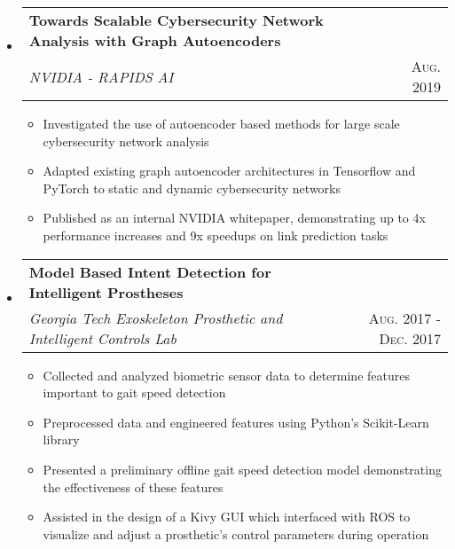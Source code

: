 \documentclass[letterpaper,11pt]{article}
\makeatletter
\newcommand{\resumePlainItem}[1]{
  \item\small{#1 \vspace{-2pt}}
}
\newcommand{\resumeSubheading}[4]{
  \vspace{-1pt}\item[]
    \begin{tabular*}{0.97\textwidth}{l@{\extracolsep{\fill}}r}
      \textbf{#1} & #2 \\
      \textit{\small#3} & \textsc{\small #4} \\ %
    \end{tabular*}\vspace{-5pt}
}
\newcommand{\resumeSubHeadingListStart}{\begin{itemize}[leftmargin=*]}
\newcommand{\resumeSubHeadingListEnd}{\end{itemize}}
\newcommand{\resumeItemListStart}{\begin{itemize}}
\newcommand{\resumeItemListEnd}{\end{itemize}\vspace{-5pt}}
\newenvironment{resumeItemList}{\resumeItemListStart}{\resumeItemListEnd}
\newenvironment{resumeSubheadingList}{\resumeSubHeadingListStart}{\resumeSubHeadingListEnd}
\makeatother
\begin{document}
\begin{resumeSubheadingList}
    \resumeSubheading
    {Towards Scalable Cybersecurity Network Analysis with Graph Autoencoders}{}
    {NVIDIA - RAPIDS AI}{Aug. 2019}
    \begin{resumeItemList}
      \resumePlainItem{Investigated the use of autoencoder based methods for large scale cybersecurity network analysis}
      \resumePlainItem{Adapted existing graph autoencoder architectures in Tensorflow and PyTorch to static and dynamic
      cybersecurity networks}
      \resumePlainItem{Published as an internal NVIDIA whitepaper, demonstrating up to 4x performance increases and 
      9x speedups on link prediction tasks}
    \end{resumeItemList}

    \resumeSubheading
    {Model Based Intent Detection for Intelligent Prostheses}{}
    {Georgia Tech Exoskeleton Prosthetic and Intelligent Controls Lab}{Aug. 2017 - Dec. 2017}
    \begin{resumeItemList}
      \resumePlainItem{Collected and analyzed biometric sensor data to determine features important to gait
      speed detection}
      \resumePlainItem{Preprocessed data and engineered features using Python's Scikit-Learn library} %
      \resumePlainItem{Presented a preliminary offline gait speed detection model demonstrating the effectiveness of these features}
      \resumePlainItem{Assisted in the design of a Kivy GUI which interfaced with ROS to visualize and adjust a prosthetic's control
      parameters during operation}
    \end{resumeItemList}
  \end{resumeSubheadingList}

\end{document}
